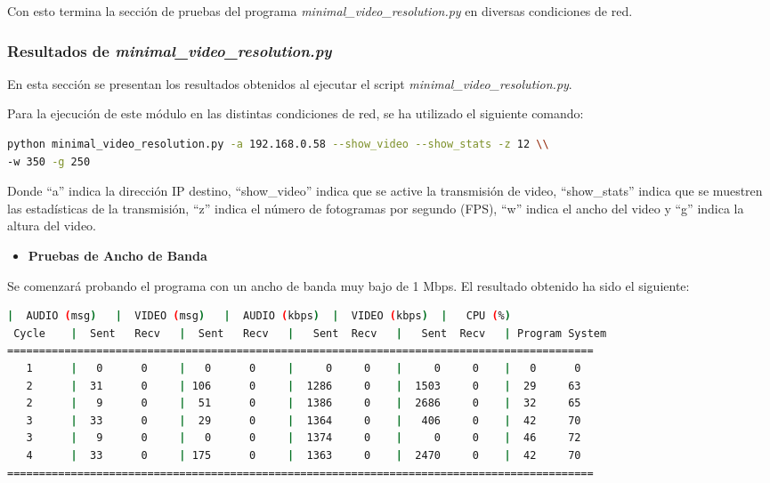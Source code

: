 Con esto termina la sección de pruebas del programa \textit{minimal\_video\_resolution.py} en diversas condiciones de red. 

\newpage

\subsubsection{Resultados de \textit{minimal\_video\_resolution.py}}
En esta sección se presentan los resultados obtenidos al ejecutar el script \textit{minimal\_video\_resolution.py}.

Para la ejecución de este módulo en las distintas condiciones de red, se ha utilizado el siguiente comando:
\begin{lstlisting}[language=bash,basicstyle=\ttfamily\scriptsize]
python minimal_video_resolution.py -a 192.168.0.58 --show_video --show_stats -z 12 \\
-w 350 -g 250
\end{lstlisting}
Donde ``a'' indica la dirección IP destino, ``show\_video'' indica que se active la transmisión de video, ``show\_stats'' indica que se muestren las estadísticas de la transmisión, ``z'' indica el número de fotogramas por segundo (FPS), ``w'' indica el ancho del video y ``g'' indica la altura del video.
\vspace{\baselineskip}

\begin{itemize}
    \item \textbf{Pruebas de Ancho de Banda}
\end{itemize}

Se comenzará probando el programa con un ancho de banda muy bajo de 1 Mbps. El resultado obtenido ha sido el siguiente:
\vspace{\baselineskip}

\begin{adjustbox}{max width=\textwidth}
\begin{lstlisting}[language=bash,basicstyle=\ttfamily\scriptsize]
          |  AUDIO (msg)   |  VIDEO (msg)   |  AUDIO (kbps)  |  VIDEO (kbps)  |   CPU (%)
 Cycle    |  Sent   Recv   |  Sent   Recv   |   Sent  Recv   |   Sent  Recv   | Program System
============================================================================================
   1      |   0      0     |   0      0     |     0     0    |     0     0    |   0      0
   2      |  31      0     | 106      0     |  1286     0    |  1503     0    |  29     63
   2      |   9      0     |  51      0     |  1386     0    |  2686     0    |  32     65
   3      |  33      0     |  29      0     |  1364     0    |   406     0    |  42     70
   3      |   9      0     |   0      0     |  1374     0    |     0     0    |  46     72
   4      |  33      0     | 175      0     |  1363     0    |  2470     0    |  42     70
============================================================================================
\end{lstlisting}
\end{adjustbox}

